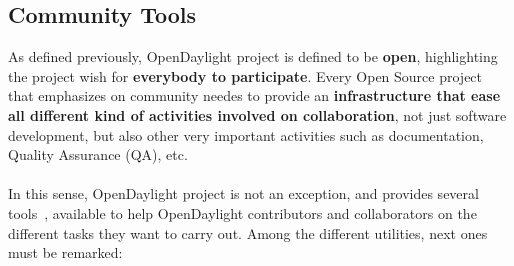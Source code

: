 \documentclass[a4paper, 12pt]{book}
\begin{document}
\subsection{Community Tools}
As defined previously, OpenDaylight project is defined to be \textbf{open}, highlighting the project wish for \textbf{everybody to participate}. Every Open Source project that emphasizes on community needes to provide an \textbf{infrastructure that ease all different kind of activities involved on collaboration}, not just software development, but also other very important activities such as documentation, Quality Assurance (QA), etc.\\
\\
In this sense, OpenDaylight project is not an exception, and provides several tools~\cite{OpenDaylightTools}, available to help OpenDaylight contributors and collaborators on the different tasks they want to carry out. Among the different utilities, next ones must be remarked:
\end{document}
